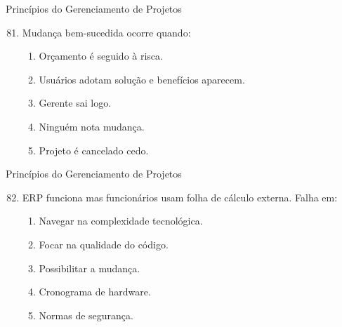 \documentclass{beamer}
\begin{document}
\begin{frame}{Princípios do Gerenciamento de Projetos}
	\begin{enumerate}
		\setcounter{enumi}{80}
		\justifying
		\item Mudança bem-sucedida ocorre quando:
		\begin{enumerate}[a]
			\item Orçamento é seguido à risca.
			\item \alert<2>{Usuários adotam solução e benefícios aparecem.}
			\item Gerente sai logo.
			\item Ninguém nota mudança.
			\item Projeto é cancelado cedo.
		\end{enumerate}
	\end{enumerate}
\end{frame}

\begin{frame}{Princípios do Gerenciamento de Projetos}
	\begin{enumerate}
		\setcounter{enumi}{81}
		\justifying
		\item ERP funciona mas funcionários usam folha de cálculo externa. Falha em:
		\begin{enumerate}[a]
			\item Navegar na complexidade tecnológica.
			\item Focar na qualidade do código.
			\item \alert<2>{Possibilitar a mudança.}
			\item Cronograma de hardware.
			\item Normas de segurança.
		\end{enumerate}
	\end{enumerate}
\end{frame}
\end{document}

